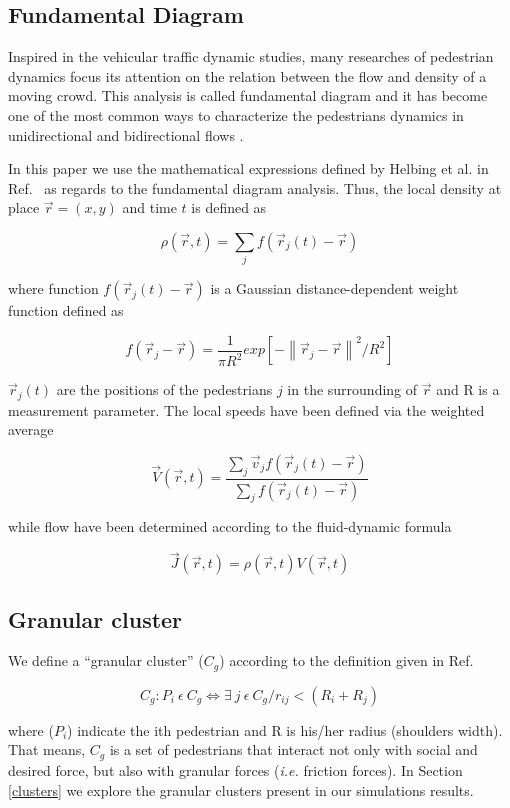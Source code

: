\subsection{\label{fundamental-diagram} Fundamental Diagram}

Inspired in the vehicular traffic dynamic studies, many researches of pedestrian dynamics focus its attention on the relation between the flow and density of a moving crowd. This analysis is called fundamental diagram and it has become one of the most common ways to characterize the pedestrians dynamics in unidirectional and bidirectional flows \cite{fruin1,mori1,polus1,seyfried1,jelic1}. 

In this paper we use the mathematical expressions defined by Helbing et al. in Ref.~\cite{helbing3} as regards to the fundamental diagram analysis. Thus, the local density at place $\vec{r}=(x,y)$ and time $t$ is defined as

\begin{equation}
\rho(\vec{r},t)=\sum_{j}f(\vec{r}_j(t)-\vec{r}) \label{ec-density}
\end{equation}

where function $f(\vec{r}_j(t)-\vec{r})$ is a Gaussian distance-dependent weight function defined as

\begin{equation}
f(\vec{r}_j-\vec{r})=\frac{1}{\pi R^2}exp[-\left \| \vec{r}_j-\vec{r} \right \|^2/R^2] \label{ec-f}
\end{equation}

$\vec{r}_j(t)$ are the positions of the pedestrians $j$ in the surrounding of $\vec{r}$ and R is a measurement parameter. 
The local speeds have been defined via the weighted average  

\begin{equation}
\vec{V}(\vec{r},t)=\frac{\sum_j \vec{v}_jf(\vec{r}_j(t)-\vec{r}) }{\sum_j f(\vec{r}_j(t)-\vec{r}) } \label{ec-v}
\end{equation}

while flow have been determined according to the fluid-dynamic formula

\begin{equation}
\vec{J}(\vec{r},t)=\rho(\vec{r},t)V(\vec{r},t) \label{ec-flow}
\end{equation}


\subsection{\label{granular-cluster} Granular cluster}

We define a ``granular cluster'' ($C_g$) according to the definition given in Ref.~\cite{Dorso1}

\begin{equation}
C_g:P_i~\epsilon~ C_g \Leftrightarrow \exists~ j~\epsilon~C_g / r_{ij} < (R_i+R_j) \label{ec-cluster}
\end{equation}


where ($P_i$) indicate the ith pedestrian and R is his/her radius (shoulders width). That means, $C_g$ is a
set of pedestrians that interact not only with social and desired force, but also with granular forces (\textit{i.e.} friction forces).
In Section \ref{clusters} we explore the granular clusters present in our simulations results. 
